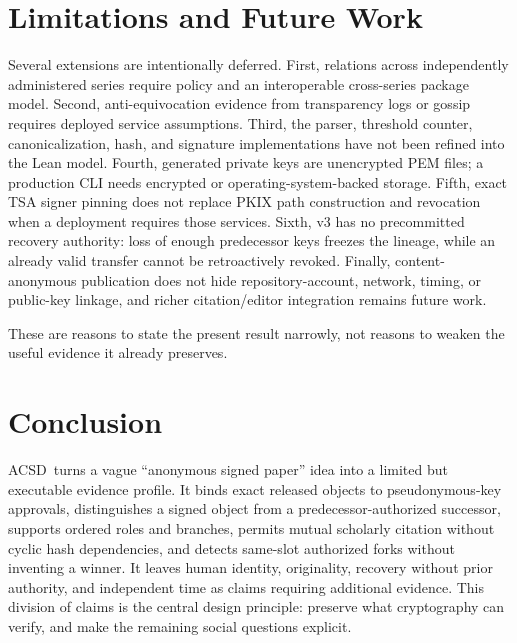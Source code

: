 \documentclass[11pt]{article}
\newcommand{\acsd}{\textsc{ACSD}}
\begin{document}
\section{Limitations and Future Work}

Several extensions are intentionally deferred. First, relations across independently administered series require policy and an interoperable cross-series package model. Second, anti-equivocation evidence from transparency logs or gossip requires deployed service assumptions. Third, the parser, threshold counter, canonicalization, hash, and signature implementations have not been refined into the Lean model. Fourth, generated private keys are unencrypted PEM files; a production CLI needs encrypted or operating-system-backed storage. Fifth, exact TSA signer pinning does not replace PKIX path construction and revocation when a deployment requires those services. Sixth, v3 has no precommitted recovery authority: loss of enough predecessor keys freezes the lineage, while an already valid transfer cannot be retroactively revoked. Finally, content-anonymous publication does not hide repository-account, network, timing, or public-key linkage, and richer citation/editor integration remains future work.

These are reasons to state the present result narrowly, not reasons to weaken the useful evidence it already preserves.

\section{Conclusion}

\acsd\ turns a vague ``anonymous signed paper'' idea into a limited but executable evidence profile. It binds exact released objects to pseudonymous-key approvals, distinguishes a signed object from a predecessor-authorized successor, supports ordered roles and branches, permits mutual scholarly citation without cyclic hash dependencies, and detects same-slot authorized forks without inventing a winner. It leaves human identity, originality, recovery without prior authority, and independent time as claims requiring additional evidence. This division of claims is the central design principle: preserve what cryptography can verify, and make the remaining social questions explicit.
\end{document}
